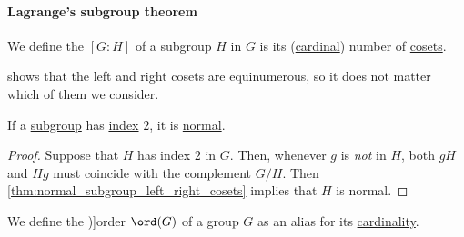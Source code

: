 \paragraph{Lagrange's subgroup theorem}

\begin{definition}\label{def:subgroup_index}
  We define the  \( [G : H] \) of a subgroup \( H \) in \( G \) is its (\hyperref[def:cardinal]{cardinal}) number of \hyperref[def:subgroup_cosets]{cosets}.
\end{definition}
\begin{comments}
  \item {} shows that the left and right cosets are equinumerous, so it does not matter which of them we consider.
\end{comments}

\begin{proposition}\label{thm:subgroup_of_index_2_is_normal}
  If a \hyperref[def:group/subobject]{subgroup} has \hyperref[def:subgroup_index]{index} \( 2 \), it is \hyperref[def:normal_subgroup]{normal}.
\end{proposition}
\begin{proof}
  Suppose that \( H \) has index \( 2 \) in \( G \). Then, whenever \( g \) is \emph{not} in \( H \), both \( gH \) and \( Hg \) must coincide with the complement \( G / H \). Then \cref{thm:normal_subgroup_left_right_cosets} implies that \( H \) is normal.
\end{proof}

\begin{definition}\label{def:group_order}
  We define the \term[ru=порядок (\cite[81]{Тыртышников2017ОсновыАлгебры})]{order} \( \ord(G) \) of a group \( G \) as an alias for its \hyperref[def:cardinality]{cardinality}.
\end{definition}

